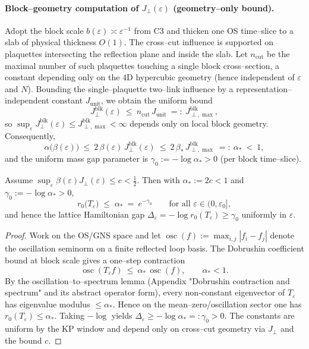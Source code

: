 \documentclass[11pt]{amsart}
\begin{document}
\paragraph{Block–geometry computation of $J_{\perp}(\varepsilon)$ (geometry–only bound).}
Adopt the block scale $b(\varepsilon)\asymp\varepsilon^{-1}$ from C3 and thicken one OS time–slice to a slab of physical thickness $O(1)$. The cross–cut influence is supported on plaquettes intersecting the reflection plane and inside the slab. Let $n_{\text{cut}}$ be the maximal number of such plaquettes touching a single block cross–section, a constant depending only on the $4$D hypercubic geometry (hence independent of $\varepsilon$ and $N$). Bounding the single–plaquette two–link influence by a representation–independent constant $J_{\text{unit}}$, we obtain the uniform bound
\[
  J^{\text{blk}}_{\perp}(\varepsilon)\ \le\ n_{\text{cut}}\,J_{\text{unit}}\ =:\ J^{\text{blk}}_{\perp,\max},
\]
so $\sup_{\varepsilon} J^{\mathrm{blk}}_{\perp}(\varepsilon)\le J^{\mathrm{blk}}_{\perp,\max}<\infty$ depends only on local block geometry. Consequently,
\[
  \alpha\bigl(\beta(\varepsilon)\bigr)\ \le\ 2\,\beta(\varepsilon)\,J^{\mathrm{blk}}_{\perp}(\varepsilon)\ \le\ 2\,\beta_*\,J^{\mathrm{blk}}_{\perp,\max}\ =:\ \alpha_*\ <\ 1,
\]
and the uniform mass gap parameter is $\gamma_0:=-\log \alpha_*>0$ (per block time–slice).

\begin{theorem}
Assume $\sup_{\varepsilon}\beta(\varepsilon) J_{\perp}(\varepsilon)\le c<\tfrac12$. Then with $\alpha_*:=2c<1$ and $\gamma_0:=-\log\alpha_*>0$,
\[
  r_0\bigl(T_{\varepsilon}\bigr)\;\le\;\alpha_*\ =\ e^{-\gamma_0}\qquad\text{for all }\varepsilon\in(0,\varepsilon_0],
\]
and hence the lattice Hamiltonian gap $\Delta_{\varepsilon}=-\log r_0(T_{\varepsilon})\ge \gamma_0$ uniformly in $\varepsilon$.
\end{theorem}

\begin{proof}[Proof]
Work on the OS/GNS space and let $\operatorname{osc}(f):=\max_{i,j}|f_i-f_j|$ denote the oscillation seminorm on a finite reflected loop basis. The Dobrushin coefficient bound at block scale gives a one–step contraction
\[
  \operatorname{osc}(T_{\varepsilon} f)\ \le\ \alpha_*\,\operatorname{osc}(f),\qquad \alpha_*<1.
\]
By the oscillation–to–spectrum lemma (Appendix "Dobrushin contraction and spectrum" and its abstract operator form), every non-constant eigenvector of $T_{\varepsilon}$ has eigenvalue modulus $\le \alpha_*$. Hence on the mean–zero/oscillation sector one has $r_0(T_{\varepsilon})\le \alpha_*$. Taking $-\log$ yields $\Delta_{\varepsilon}\ge -\log\alpha_*=:\gamma_0>0$. The constants are uniform by the KP window and depend only on cross–cut geometry via $J_{\perp}$ and the bound $c$.
\end{proof}
\end{document}
